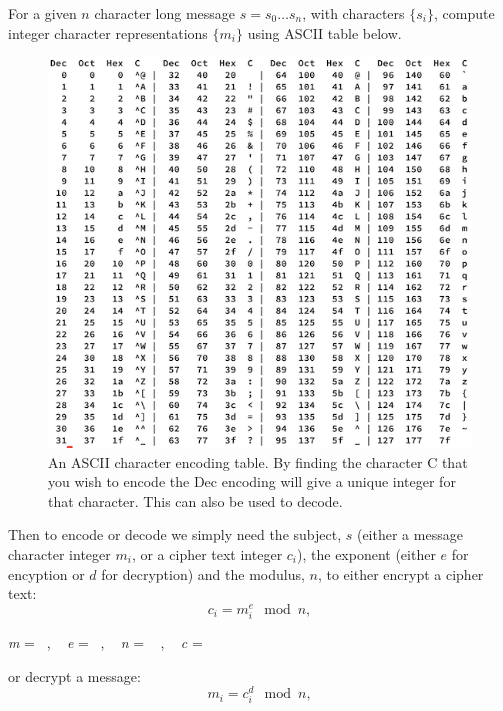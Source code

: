 \documentclass[
  letterpaper,
  DIV=11,
  numbers=noendperiod]{scrreprt}
\begin{document}
For a given \(n\) character long message \(s=s_0\ldots s_n\), with
characters \(\{s_i\}\), compute integer character representations
\(\{m_i\}\) using ASCII table below.

\begin{figure}

{\centering \includegraphics{images/ascii.png}

}

\caption{An ASCII character encoding table. By finding the character C
that you wish to encode the Dec encoding will give a unique integer for
that character. This can also be used to decode.}

\end{figure}

Then to encode or decode we simply need the subject, \(s\) (either a
message character integer \(m_i\), or a cipher text integer \(c_i\)),
the exponent (either \(e\) for encyption or \(d\) for decryption) and
the modulus, \(n\), to either encrypt a cipher text: \begin{equation*}
    c_i = m_i^e \mod n,
\end{equation*}

\emph{m} = ~, ~ \emph{e} = ~, ~ \emph{n} = ~ , ~ \emph{c} = ~

or decrypt a message: \begin{equation*}
    m_i = c_i^d \mod n,
\end{equation*}
\end{document}
